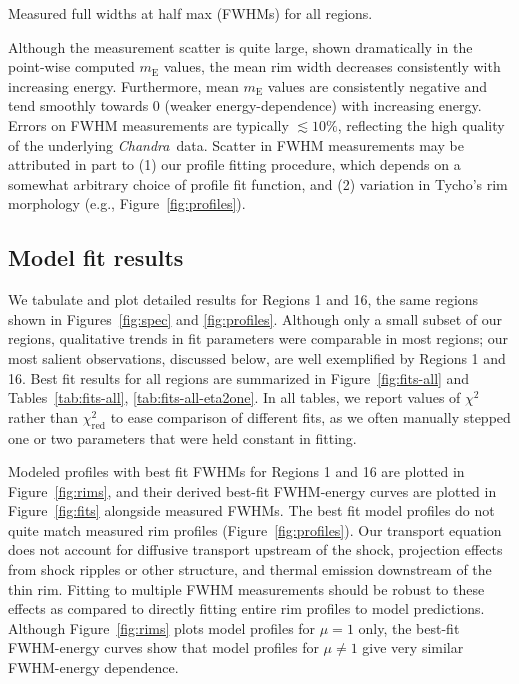 \documentclass[iop, apj, numberedappendix]{emulateapj}
\newcommand*{\mt}{\mathrm}
\newcommand*{\Chandra}{\textit{Chandra}\ }
\newcommand*{\mE}{m_\mt{E}}
\begin{document}
\begin{table*}
    \iftoggle{manuscript}{
        \tiny
    }{
        \scriptsize
    }
    \centering
    \caption{Measured full widths at half max (FWHMs) for all regions.
             \label{tab:fwhms}}
    
\end{table*}

Although the measurement scatter is quite large, shown dramatically in the
point-wise computed $\mE$ values, the mean rim width decreases consistently
with increasing energy.  Furthermore, mean $\mE$ values are consistently
negative and tend smoothly towards $0$ (weaker energy-dependence) with
increasing energy.  Errors on FWHM measurements are typically $\lesssim 10\%$,
reflecting the high quality of the underlying \Chandra data.  Scatter in FWHM
measurements may be attributed in part to (1) our profile fitting procedure,
which depends on a somewhat arbitrary choice of profile fit function, and (2)
variation in Tycho's rim morphology (e.g., Figure~\ref{fig:profiles}).

\subsection{Model fit results}
\label{sec:fit-results}

We tabulate and plot detailed results for Regions 1 and 16, the same regions
shown in Figures~\ref{fig:spec} and \ref{fig:profiles}.  Although only a small
subset of our regions, qualitative trends in fit parameters were comparable in
most regions; our most salient observations, discussed below, are well
exemplified by Regions 1 and 16.  Best fit results for all regions are
summarized in Figure~\ref{fig:fits-all} and Tables~\ref{tab:fits-all},
\ref{tab:fits-all-eta2one}.  In all tables, we report values of $\chi^2$ rather
than $\chi^2_\mt{red}$ to ease comparison of different fits, as we often
manually stepped one or two parameters that were held constant in fitting.

Modeled profiles with best fit FWHMs for Regions 1 and 16 are plotted in
Figure~\ref{fig:rims}, and their derived best-fit FWHM-energy curves
are plotted in Figure~\ref{fig:fits} alongside measured FWHMs.
The best fit model profiles do not quite match measured rim profiles
(Figure~\ref{fig:profiles}).  Our transport equation does not account for
diffusive transport upstream of the shock, projection effects from shock
ripples or other structure, and thermal emission downstream of the thin rim.
Fitting to multiple FWHM measurements should be robust to these effects as
compared to directly fitting entire rim profiles to model predictions.
Although Figure~\ref{fig:rims} plots model profiles for $\mu = 1$ only, the
best-fit FWHM-energy curves show that model profiles for $\mu \neq 1$ give very
similar FWHM-energy dependence.
\end{document}
